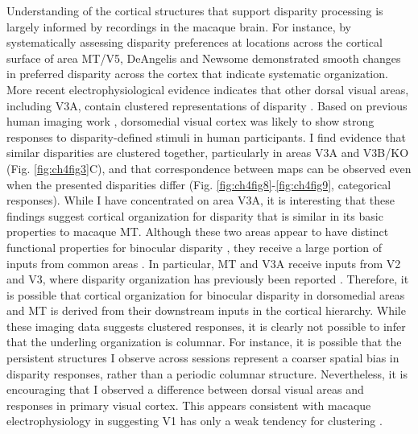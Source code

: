 Understanding of the cortical structures that support disparity processing is largely informed by recordings in the macaque brain. For instance, by systematically assessing disparity preferences at locations across the cortical surface of area MT/V5, DeAngelis and Newsome \cite{DeAngelis:1999fk} demonstrated smooth changes in preferred disparity across the cortex that indicate systematic organization. More recent electrophysiological evidence indicates that other dorsal visual areas, including V3A, contain clustered representations of disparity \cite{Anzai:2011gb,Yeagle_Lafer-Sousa_Conway_2013}. Based on previous human imaging work \cite{Backus:2001ly,Preston:2008dg}, dorsomedial visual cortex was likely to show strong responses to disparity-defined stimuli in human participants. I find evidence that similar disparities are clustered together, particularly in areas V3A and V3B/KO (Fig. \ref{fig:ch4fig3}C), and that correspondence between maps can be observed even when the presented disparities differ (Fig. \ref{fig:ch4fig8}-\ref{fig:ch4fig9}, categorical responses). While I have concentrated on area V3A, it is interesting that these findings suggest cortical organization for disparity that is similar in its basic properties to macaque MT. Although these two areas appear to have distinct functional properties for binocular disparity \cite{Cottereau:2011uq}, they receive a large portion of inputs from common areas \cite{Felleman:1991kg}. In particular, MT and V3A receive inputs from V2 and V3, where disparity organization has previously been reported \cite{Roe:1995ys,Chen:2008vn,Adams:2001wt,Anzai:2011gb}. Therefore, it is possible that cortical organization for binocular disparity in dorsomedial areas and MT is derived from their downstream inputs in the cortical hierarchy.
While these imaging data suggests clustered responses, it is clearly not possible to infer that the underling organization is columnar. For instance, it is possible that the persistent structures I observe across sessions represent a coarser spatial bias in disparity responses, rather than a periodic columnar structure. Nevertheless, it is encouraging that I observed a difference between dorsal visual areas and responses in primary visual cortex. This appears consistent with macaque electrophysiology in suggesting V1 has only a weak tendency for clustering \cite{LeVay:1988ve,Prince:2002cr}. 

